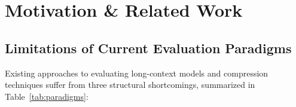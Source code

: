 \documentclass[11pt,a4paper]{article}
\begin{document}
\section{Motivation \& Related Work}
\label{sec:motivation}

\subsection{Limitations of Current Evaluation Paradigms}
Existing approaches to evaluating long-context models and compression techniques suffer from three structural shortcomings, summarized in Table~\ref{tab:paradigms}:

\begin{table}[t]
\centering
\small
\caption{\textbf{Comparison of Common Evaluation Paradigms and Capabilities Provided by CRBench.} Summary of dimensions captured across long-context accuracy benchmarks, synthetic needle tests, inference profilers, and CRBench.}
\label{tab:paradigms}
\end{table}
\end{document}
